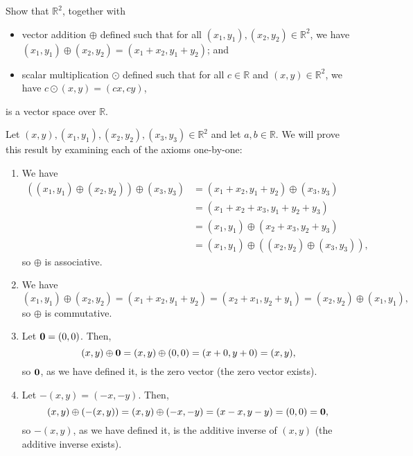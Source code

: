 \begin{exmp}
Show that $ \mathbb{R}^2 $, together with
\begin{itemize}
    \item vector addition $ \oplus $ defined such that for all $ (x_1,y_1),(x_2,y_2)\in\mathbb{R}^2 $, we have $ (x_1,y_1)\oplus(x_2,y_2)=(x_1+x_2,y_1+y_2) $; and
    \item scalar multiplication $ \odot $ defined such that for all $ c\in\mathbb{R} $ and $ (x,y)\in\mathbb{R}^2 $, we have $ c\odot(x,y)=(cx,cy) $,
\end{itemize} is a vector space over $ \mathbb{R} $.
\end{exmp}
\begin{sltn}
Let $ (x,y),(x_1,y_1),(x_2,y_2),(x_3,y_3)\in\mathbb{R}^2 $ and let $ a,b\in\mathbb{R} $. We will prove this result by examining each of the axioms one-by-one:
\begin{enumerate}
    \item We have
    \begin{align*}
        ((x_1,y_1)\oplus(x_2,y_2))\oplus(x_3,y_3) &= (x_1+x_2,y_1+y_2)\oplus(x_3,y_3) \\
        &= (x_1+x_2+x_3,y_1+y_2+y_3) \\
        &= (x_1,y_1)\oplus(x_2+x_3,y_2+y_3) \\
        &= (x_1,y_1)\oplus((x_2,y_2)\oplus(x_3,y_3)),
    \end{align*}
    so $ \oplus $ is associative.

    \item We have
    \begin{equation*}
        (x_1,y_1)\oplus(x_2,y_2)=(x_1+x_2,y_1+y_2)=(x_2+x_1,y_2+y_1)=(x_2,y_2)\oplus(x_1,y_1),
    \end{equation*}
    so $ \oplus $ is commutative.

    \item Let $ \boldsymbol{\mathbf{0}}=(0,0) $. Then,
    \begin{equation*}
        (x,y)\oplus\boldsymbol{\mathbf{0}}=(x,y)\oplus(0,0)=(x+0,y+0)=(x,y),
    \end{equation*}
    so $ \boldsymbol{\mathbf{0}} $, as we have defined it, is the zero vector (the zero vector exists).

    \item Let $ -(x,y)=(-x,-y) $. Then,
    \begin{equation*}
        (x,y)\oplus(-(x,y))=(x,y)\oplus(-x,-y)=(x-x,y-y)=(0,0)=\boldsymbol{\mathbf{0}},
    \end{equation*}
    so $ -(x,y) $, as we have defined it, is the additive inverse of $ (x,y) $ (the additive inverse exists).


\end{enumerate}
\end{sltn}
